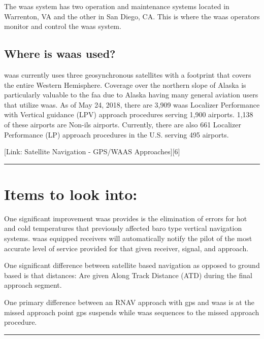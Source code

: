 The \ac{waas} system has two operation and maintenance systems located in
Warrenton, VA and the other in San Diego, CA. This is where the \ac{waas}
operators monitor and control the \ac{waas} system.

\subsection{Where is \ac{waas} used?}\label{where-is-waas-used}

\ac{waas} currently uses three geosynchronous satellites with a footprint
that covers the entire Western Hemisphere. Coverage over the northern
slope of Alaska is particularly valuable to the \ac{faa} due to Alaska having
many general aviation users that utilize \ac{waas}. As of May 24, 2018, there
are 3,909 \ac{waas} Localizer Performance
with Vertical guidance (LPV) approach procedures serving 1,900 airports.
1,138 of these airports are Non-\ac{ils} airports. Currently, there are also
661 Localizer Performance (LP) approach procedures in the U.S. serving
495 airports.

{[}Link: Satellite Navigation - GPS/WAAS Approaches{]}{[}6{]}

\begin{center}\rule{0.5\linewidth}{\linethickness}\end{center}

\section{Items to look into:}\label{items-to-look-into}

One significant improvement \ac{waas} provides is the elimination of
errors for hot and cold temperatures that previously affected baro type
vertical navigation systems. \ac{waas} equipped receivers will automatically
notify the pilot of the most accurate level of service provided for that
given receiver, signal, and approach.

One significant difference between satellite based navigation as opposed
to ground based is that distances: Are given Along Track Distance (ATD)
during the final approach segment.

One primary difference between an RNAV approach with \ac{gps} and \ac{waas} is at
the missed approach point \ac{gps} suspends while \ac{waas} sequences to the
missed approach procedure.

\begin{center}\rule{0.5\linewidth}{\linethickness}\end{center}


